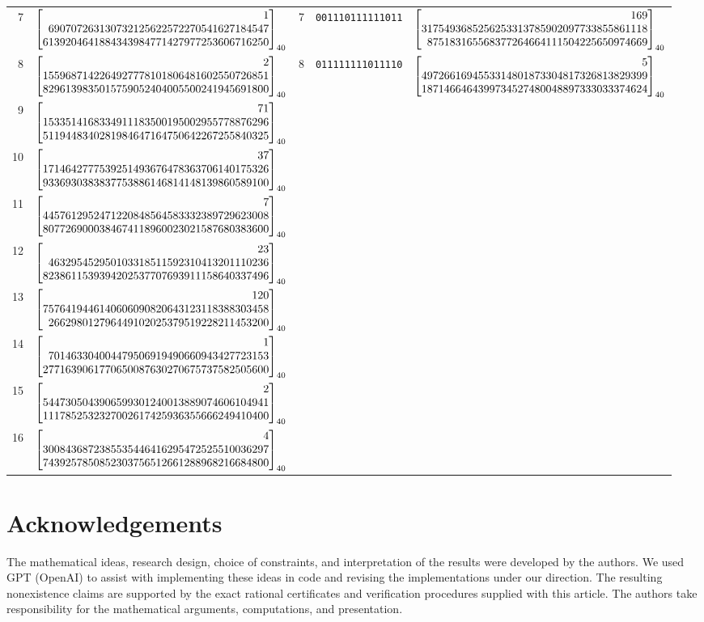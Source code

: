 \documentclass[11pt]{article}
\theoremstyle{remark}
\numberwithin{equation}{section}
\begin{document}
\begin{longtable}{rcrlc}
7&$\srgBigInt{1}{690707263130732125622572270541627184547}{6139204641884343984771427977253606716250}$&7&\texttt{001110111111011}&$\srgBigInt{169}{3175493685256253313785902097733855861118}{875183165568377264664111504225650974669}$\\[1pt]

8&$\srgBigInt{2}{1559687142264927778101806481602550726851}{8296139835015759052404005500241945691800}$&8&\texttt{011111111011110}&$\srgBigInt{5}{4972661694553314801873304817326813829399}{1871466464399734527480048897333033374624}$\\[1pt]

9&$\srgBigInt{71}{1533514168334911183500195002955778876296}{5119448340281984647164750642267255840325}$&&&\\[1pt]

10&$\srgBigInt{37}{1714642777539251493676478363706140175326}{9336930383837753886146814148139860589100}$&&&\\[1pt]

11&$\srgBigInt{7}{4457612952471220848564583332389729623008}{8077269000384674118960023021587680383600}$&&&\\[1pt]

12&$\srgBigInt{23}{463295452950103318511592310413201110236}{8238611539394202537707693911158640337496}$&&&\\[1pt]

13&$\srgBigInt{120}{7576419446140606090820643123118388303458}{266298012796449102025379519228211453200}$&&&\\[1pt]

14&$\srgBigInt{1}{701463304004479506919490660943427723153}{2771639061770650087630270675737582505600}$&&&\\[1pt]

15&$\srgBigInt{2}{5447305043906599301240013889074606104941}{1117852532327002617425936355666249410400}$&&&\\[1pt]

16&$\srgBigInt{4}{3008436872385535446416295472525510036297}{7439257850852303756512661288968216684800}$&&&\\[1pt]

\end{longtable}\endgroup
\clearpage
\section*{Acknowledgements}
The mathematical ideas, research design, choice of constraints, and
interpretation of the results were developed by the authors. We used
GPT (OpenAI) to assist with implementing these ideas in code and
revising the implementations under our direction. The resulting
nonexistence claims are supported by the exact rational certificates
and verification procedures supplied with this article. The authors
take responsibility for the mathematical arguments, computations,
and presentation.
\end{document}
